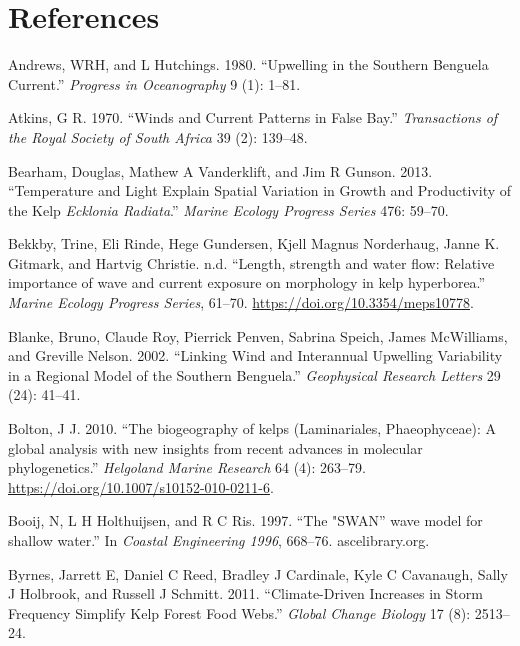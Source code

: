\documentclass[
  a4paper,
]{article}
\begin{document}
\hypertarget{references}{%
\section*{References}\label{references}}

\hypertarget{refs}{}
\leavevmode\hypertarget{ref-Andrews1980}{}%
Andrews, WRH, and L Hutchings. 1980. ``Upwelling in the Southern
Benguela Current.'' \emph{Progress in Oceanography} 9 (1): 1--81.

\leavevmode\hypertarget{ref-Atkins1970-bx}{}%
Atkins, G R. 1970. ``Winds and Current Patterns in False Bay.''
\emph{Transactions of the Royal Society of South Africa} 39 (2):
139--48.

\leavevmode\hypertarget{ref-bearham2013}{}%
Bearham, Douglas, Mathew A Vanderklift, and Jim R Gunson. 2013.
``Temperature and Light Explain Spatial Variation in Growth and
Productivity of the Kelp \emph{Ecklonia Radiata}.'' \emph{Marine Ecology
Progress Series} 476: 59--70.

\leavevmode\hypertarget{ref-bekkby2014}{}%
Bekkby, Trine, Eli Rinde, Hege Gundersen, Kjell Magnus Norderhaug, Janne
K. Gitmark, and Hartvig Christie. n.d. ``Length, strength and water
flow: Relative importance of wave and current exposure on morphology in
kelp hyperborea.'' \emph{Marine Ecology Progress Series}, 61--70.
\url{https://doi.org/10.3354/meps10778}.

\leavevmode\hypertarget{ref-Blanke2002}{}%
Blanke, Bruno, Claude Roy, Pierrick Penven, Sabrina Speich, James
McWilliams, and Greville Nelson. 2002. ``Linking Wind and Interannual
Upwelling Variability in a Regional Model of the Southern Benguela.''
\emph{Geophysical Research Letters} 29 (24): 41--41.

\leavevmode\hypertarget{ref-Bolton2010}{}%
Bolton, J J. 2010. ``The biogeography of kelps (Laminariales,
Phaeophyceae): A global analysis with new insights from recent advances
in molecular phylogenetics.'' \emph{Helgoland Marine Research} 64 (4):
263--79. \url{https://doi.org/10.1007/s10152-010-0211-6}.

\leavevmode\hypertarget{ref-Booij1997-nx}{}%
Booij, N, L H Holthuijsen, and R C Ris. 1997. ``The "SWAN'' wave model
for shallow water.'' In \emph{Coastal Engineering 1996}, 668--76.
ascelibrary.org.

\leavevmode\hypertarget{ref-byrnes2011}{}%
Byrnes, Jarrett E, Daniel C Reed, Bradley J Cardinale, Kyle C Cavanaugh,
Sally J Holbrook, and Russell J Schmitt. 2011. ``Climate-Driven
Increases in Storm Frequency Simplify Kelp Forest Food Webs.''
\emph{Global Change Biology} 17 (8): 2513--24.
\end{document}
